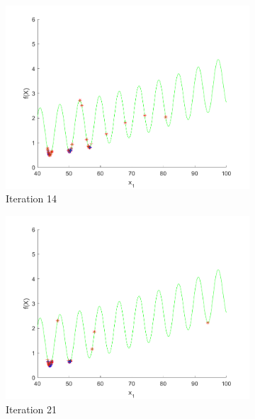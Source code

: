 \begin{figure}
\begin{subfigure}[b]{0.4\textwidth}
   \includegraphics[width=\textwidth]{img/smpl/grwnk1dshft/loa-iter-14}
   \caption{Iteration 14}
   \label{fig:i2-iter-2}
 \end{subfigure}
 \begin{subfigure}[b]{0.4\textwidth}
   \includegraphics[width=\textwidth]{img/smpl/grwnk1dshft/loa-iter-21}
   \caption{Iteration 21}
   \label{fig:i2-iter-3}
 \end{subfigure}
 \begin{subfigure}[b]{0.4\textwidth}

\end{subfigure}
\end{figure}
